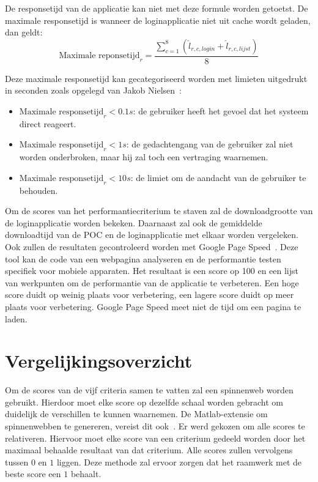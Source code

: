 De responsetijd van de applicatie kan niet met deze formule worden getoetst.
De maximale responsetijd is wanneer de loginapplicatie niet uit cache wordt geladen, dan geldt:
\begin{equation}
  \text{Maximale reponsetijd}_r= \frac{\sum\limits_{c=1}^{8}\left(\widehat{l}_{r,c,login} + \widehat{l}_{r,c,lijst}\right)}{8}
  \label{eq:performantie-max}
\end{equation}

Deze maximale responsetijd kan gecategoriseerd worden met limieten uitgedrukt in seconden zoals opgelegd van Jakob Nielsen~\cite{Nielsen1993}:  
\begin{itemize}
\item $\text{Maximale responsetijd}_r < 0.1\unit{s}$: de gebruiker heeft het gevoel dat het systeem direct reageert.
\item $\text{Maximale responsetijd}_r < 1\unit{s}$: de gedachtengang van de gebruiker zal niet worden onderbroken, maar hij zal toch een vertraging waarnemen.
\item $\text{Maximale responsetijd}_r < 10\unit{s}$: de limiet om de aandacht van de gebruiker te behouden.
\end{itemize}

Om de scores van het performantiecriterium te staven zal de downloadgrootte van de loginapplicatie worden bekeken.
Daarnaast zal ook de gemiddelde downloadtijd van de POC en de loginapplicatie met elkaar worden vergeleken.
Ook zullen de resultaten gecontroleerd worden met Google Page Speed~\cite{Morgan2011}. 
Deze tool kan de code van een webpagina analyseren en de performantie testen specifiek voor mobiele apparaten.
Het resultaat is een score op 100 en een lijst van werkpunten om de performantie van de applicatie te verbeteren.
Een hoge score duidt op weinig plaats voor verbetering,  een lagere score duidt op meer plaats voor verbetering.
Google Page Speed meet niet de tijd om een pagina te laden.


\section{Vergelijkingsoverzicht}
\label{sec:vergelijking-spinnenweb}

Om de scores van de vijf criteria samen te vatten zal een spinnenweb worden gebruikt.
Hierdoor moet elke score op dezelfde schaal worden gebracht om duidelijk de verschillen te kunnen waarnemen.
De Matlab-extensie om spinnenwebben te genereren, vereist dit ook~\cite{Martti2007}.
Er werd gekozen om alle scores te relativeren.
Hiervoor moet elke score van een criterium gedeeld worden door het maximaal behaalde resultaat van dat criterium.
Alle scores zullen vervolgens tussen $0$ en $1$ liggen.
Deze methode zal ervoor zorgen dat het raamwerk met de beste score een $1$ behaalt.

